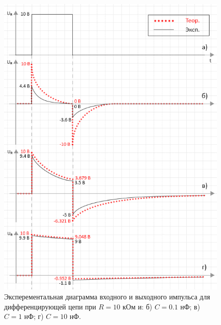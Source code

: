 \begin{figure}[H]
	\begin{center}
		\includegraphics[width=14cm]{img/diff_with_theory2}
		\caption{Эксперементальная диаграмма входного и выходного импульса для дифференцирующей цепи при $R = 10$ кОм и: б) $C = 0.1$ нФ; в) $C = 1$ нФ; г) $C = 10$ нФ.} 
		\label{d:1} %
	\end{center}
\end{figure}

